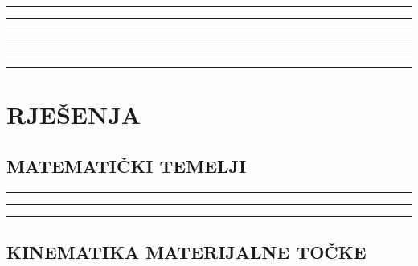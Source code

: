 \documentclass[10pt]{book}
\newcounter{zadatak} %
\newcounter{cjelina}
\begin{document}
\setcounter{zadatak}{0}

\vspace{1cm}

\noindent
{\color{boja} \rule{\linewidth}{0.3mm} }

\vspace{0.8cm} 



\noindent
{\color{boja} \rule{\linewidth}{0.3mm} }

\vspace{0.8cm}




\noindent
{\color{boja} \rule{\linewidth}{0.3mm} }





\noindent
{\color{boja} \rule{\linewidth}{0.3mm} }


\vspace{1cm}

\noindent
{\color{boja} \rule{\linewidth}{0.3mm} }


\vspace{1cm}

\noindent
{\color{boja} \rule{\linewidth}{0.3mm} }


\chapter{RJEŠENJA}
\section{MATEMATIČKI TEMELJI}


{\color{boja} \rule{\linewidth}{0.3mm} }



{\color{boja} \rule{\linewidth}{0.3mm} }




{\color{boja} \rule{\linewidth}{0.3mm} }


\setcounter{zadatak}{0}

\section{KINEMATIKA MATERIJALNE TOČKE}
\end{document}
